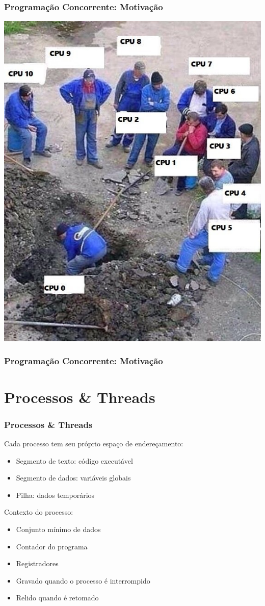\documentclass[10pt, compress]{beamer}
\begin{document}
\begin{frame}
    \frametitle{Programação Concorrente: Motivação}
    \begin{center}
        \includegraphics[width=.55\textwidth]{shared_work}
    \end{center}
\end{frame}

\begin{frame}
    \frametitle{Programação Concorrente: Motivação}
    \begin{center}
    \end{center}
\end{frame}

\section{Processos \& Threads}

\begin{frame}
    \frametitle{Processos \& Threads}
    Cada \alert{processo} tem seu próprio \alert{espaço de endereçamento}:
        \begin{itemize}
            \item \alert{Segmento de texto}: código executável
            \item \alert{Segmento de dados}: variáveis globais
            \item \alert{Pilha}: dados temporários
        \end{itemize}

    \alert{Contexto} do processo:
        \begin{itemize}
            \item Conjunto mínimo de dados
            \item Contador do programa
            \item Registradores
            \item Gravado quando o processo é interrompido
            \item Relido quando é retomado
        \end{itemize}
\end{frame}
\end{document}
